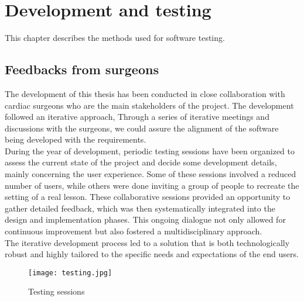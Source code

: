 \chapter{Development and testing}
\label{chp:testing}
\noindent
This chapter describes the methods used for software testing.

\section{Feedbacks from surgeons}
\noindent
The development of this thesis has been conducted in close collaboration with cardiac surgeons who are the main stakeholders of the project.
The development followed an iterative approach, Through a series of iterative meetings and discussions with the surgeons, we could assure the alignment of the software being developed with the requirements.\\
During the year of development, periodic testing sessions have been organized to assess the current state of the project and decide some development details, mainly concerning the user experience. Some of these sessions involved a reduced number of users, while others were done inviting a group of people to recreate the setting of a real lesson.
These collaborative sessions provided an opportunity to gather detailed feedback, which was then systematically integrated into the design and implementation phases.
This ongoing dialogue not only allowed for continuous improvement but also fostered a multidisciplinary approach.\\
The iterative development process led to a solution that is both technologically robust and highly tailored to the specific needs and expectations of the end users.\\


\begin{figure}[ht]
  \centering
  \texttt{[image: testing.jpg]}
  \caption{Testing sessions}
  \label{fig:testing}
\end{figure}

